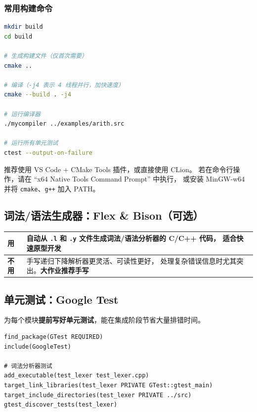 \documentclass[12pt, a4paper]{ctexart}
\begin{document}
\subsubsection{常用构建命令}

\begin{lstlisting}[language=bash, caption={CMake 构建流程（项目根目录执行）}]
mkdir build
cd build

# 生成构建文件（仅首次需要）
cmake ..

# 编译（-j4 表示 4 线程并行，加快速度）
cmake --build . -j4

# 运行编译器
./mycompiler ../examples/arith.src

# 运行所有单元测试
ctest --output-on-failure
\end{lstlisting}

\begin{tipbox}
推荐使用 VS Code + CMake Tools 插件，或直接使用 CLion。
若在命令行操作，请在 ``x64 Native Tools Command Prompt'' 中执行，
或安装 MinGW-w64 并将 \texttt{cmake}、\texttt{g++} 加入 PATH。
\end{tipbox}

\subsection{词法/语法生成器：Flex \& Bison（可选）}

\begin{center}
\renewcommand{\arraystretch}{1.4}
\begin{tabular}{>{\bfseries}p{1.5cm} p{10cm}}
\toprule
用   & 自动从 \texttt{.l} 和 \texttt{.y} 文件生成词法/语法分析器的 C/C++ 代码，
       适合快速原型开发 \\
\midrule
不用 & 手写递归下降解析器更灵活、可读性更好，
       处理复杂错误信息时尤其突出。\textbf{大作业推荐手写} \\
\bottomrule
\end{tabular}
\end{center}

\subsection{单元测试：Google Test}

为每个模块\textbf{提前写好单元测试}，能在集成阶段节省大量排错时间。

\begin{lstlisting}[caption={tests/CMakeLists.txt 示例}]
find_package(GTest REQUIRED)
include(GoogleTest)

# 词法分析器测试
add_executable(test_lexer test_lexer.cpp)
target_link_libraries(test_lexer PRIVATE GTest::gtest_main)
target_include_directories(test_lexer PRIVATE ../src)
gtest_discover_tests(test_lexer)
\end{lstlisting}
\end{document}
